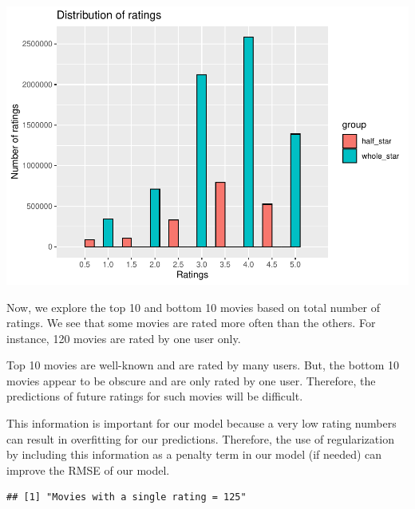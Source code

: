 \documentclass[]{article}
\newenvironment{Shaded}{\begin{snugshade}}{\end{snugshade}}
\newcommand{\DataTypeTok}[1]{\textcolor[rgb]{0.13,0.29,0.53}{#1}}
\newcommand{\DecValTok}[1]{\textcolor[rgb]{0.00,0.00,0.81}{#1}}
\newcommand{\KeywordTok}[1]{\textcolor[rgb]{0.13,0.29,0.53}{\textbf{#1}}}
\newcommand{\NormalTok}[1]{#1}
\newcommand{\OperatorTok}[1]{\textcolor[rgb]{0.81,0.36,0.00}{\textbf{#1}}}
\newcommand{\StringTok}[1]{\textcolor[rgb]{0.31,0.60,0.02}{#1}}
\begin{document}
\includegraphics{Project_MovieLens_files/figure-latex/unnamed-chunk-14-1.pdf}

Now, we explore the top 10 and bottom 10 movies based on total number of
ratings. We see that some movies are rated more often than the others.
For instance, 120 movies are rated by one user only.

Top 10 movies are well-known and are rated by many users. But, the
bottom 10 movies appear to be obscure and are only rated by one user.
Therefore, the predictions of future ratings for such movies will be
difficult.

This information is important for our model because a very low rating
numbers can result in overfitting for our predictions. Therefore, the
use of regularization by including this information as a penalty term in
our model (if needed) can improve the RMSE of our model.

\begin{Shaded}
\end{Shaded}

\begin{verbatim}
## [1] "Movies with a single rating = 125"
\end{verbatim}
\end{document}
